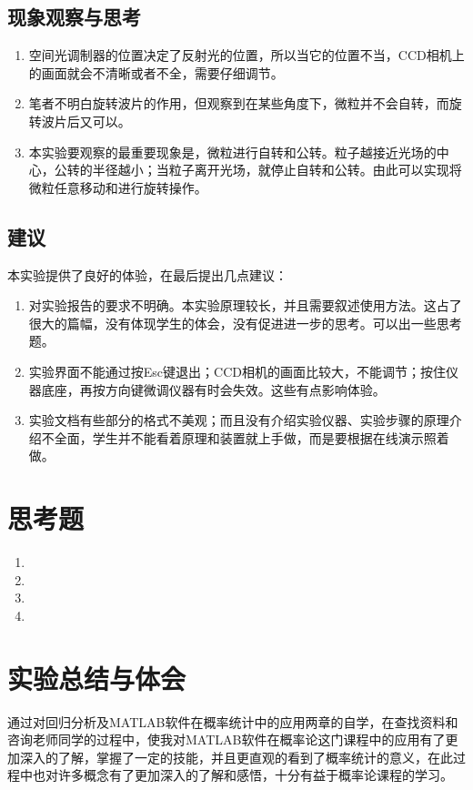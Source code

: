 \documentclass[UTF8,12pt,a4paper]{article}
\begin{document}
\subsection{现象观察与思考}
\begin{enumerate}
	\item 空间光调制器的位置决定了反射光的位置，所以当它的位置不当，CCD相机上的画面就会不清晰或者不全，需要仔细调节。
	\item 笔者不明白旋转波片的作用，但观察到在某些角度下，微粒并不会自转，而旋转波片后又可以。
	\item 本实验要观察的最重要现象是，微粒进行自转和公转。粒子越接近光场的中心，公转的半径越小；当粒子离开光场，就停止自转和公转。由此可以实现将微粒任意移动和进行旋转操作。
\end{enumerate}

\subsection{建议}
本实验提供了良好的体验，在最后提出几点建议：
\begin{enumerate}
	\item 对实验报告的要求不明确。本实验原理较长，并且需要叙述使用方法。这占了很大的篇幅，没有体现学生的体会，没有促进进一步的思考。可以出一些思考题。
	\item 实验界面不能通过按Esc键退出；CCD相机的画面比较大，不能调节；按住仪器底座，再按方向键微调仪器有时会失效。这些有点影响体验。
	\item 实验文档有些部分的格式不美观；而且没有介绍实验仪器、实验步骤的原理介绍不全面，学生并不能看着原理和装置就上手做，而是要根据在线演示照着做。
\end{enumerate}


\section{思考题}
\begin{enumerate}
	\item 
	\item 
	\item 
	\item 
\end{enumerate}

\section{实验总结与体会}
通过对回归分析及MATLAB软件在概率统计中的应用两章的自学，在查找资料和咨询老师同学的过程中，使我对MATLAB软件在概率论这门课程中的应用有了更加深入的了解，掌握了一定的技能，并且更直观的看到了概率统计的意义，在此过程中也对许多概念有了更加深入的了解和感悟，十分有益于概率论课程的学习。
\end{document}
